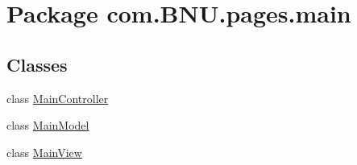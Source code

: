 \hypertarget{namespacecom_1_1_b_n_u_1_1pages_1_1main}{}\section{Package com.\+B\+N\+U.\+pages.\+main}
\label{namespacecom_1_1_b_n_u_1_1pages_1_1main}
\subsection*{Classes}
\begin{DoxyCompactItemize}
\item 
class \mbox{\hyperlink{classcom_1_1_b_n_u_1_1pages_1_1main_1_1_main_controller}{Main\+Controller}}
\item 
class \mbox{\hyperlink{classcom_1_1_b_n_u_1_1pages_1_1main_1_1_main_model}{Main\+Model}}
\item 
class \mbox{\hyperlink{classcom_1_1_b_n_u_1_1pages_1_1main_1_1_main_view}{Main\+View}}
\end{DoxyCompactItemize}
